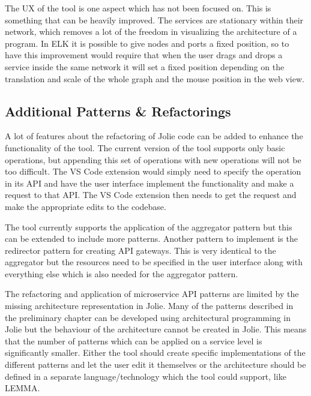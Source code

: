 The UX of the tool is one aspect which has not been focused on. This is something that can be heavily improved.
The services are stationary within their network, which removes a lot of the freedom in visualizing the architecture of a program.
In ELK it is possible to give nodes and ports a fixed position, so to have this improvement would require that when the user drags and drops a service inside the same network it will set a fixed position depending on the translation and scale of the whole graph and the mouse position in the web view.

\subsection{Additional Patterns \& Refactorings}
A lot of features about the refactoring of Jolie code can be added to enhance the functionality of the tool.
The current version of the tool supports only basic operations, but appending this set of operations with new operations will not be too difficult.
The VS Code extension would simply need to specify the operation in its API and have the user interface implement the functionality and make a request to that API.
The VS Code extension then needs to get the request and make the appropriate edits to the codebase.

The tool currently supports the application of the aggregator pattern but this can be extended to include
more patterns. Another pattern to implement is the redirector pattern for creating API gateways.
This is very identical to the aggregator but the resources need to be specified in the user interface along with everything else which is also needed for the aggregator pattern.

The refactoring and application of microservice API patterns are limited by the missing architecture representation in Jolie.
Many of the patterns described in the preliminary chapter can be developed using architectural programming in Jolie but the behaviour of the architecture cannot be created in Jolie.
This means that the number of patterns which can be applied on a service level is significantly smaller.
Either the tool should create specific implementations of the different patterns and let the user edit it themselves or the architecture should be 
defined in a separate language/technology which the tool could support, like LEMMA.

